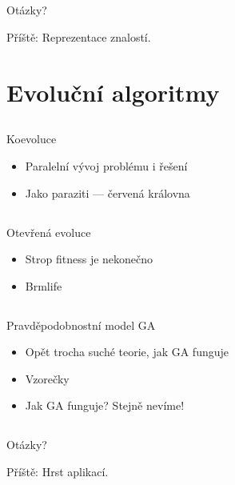 \documentclass{beamer}
\begin{document}
\subsection{}
\begin{frame}{Otázky?}
\begin{center}
Příště: Reprezentace znalostí.
\end{center}
\end{frame}

\section{Evoluční algoritmy}

\subsection{}
\begin{frame}{Koevoluce}
\begin{itemize}
\item Paralelní vývoj problému i řešení
\item Jako paraziti --- červená královna
\end{itemize}
\end{frame}

\subsection{}
\begin{frame}{Otevřená evoluce}
\begin{itemize}
\item Strop fitness je nekonečno
\item Brmlife
\end{itemize}
\end{frame}

\subsection{}
\begin{frame}{Pravděpodobnostní model GA}
\begin{itemize}
\item Opět trocha suché teorie, jak GA funguje
\item Vzorečky
\item Jak GA funguje? Stejně nevíme!
\end{itemize}
\end{frame}

\subsection{}
\begin{frame}{Otázky?}
\begin{center}
Příště: Hrst aplikací.
\end{center}
\end{frame}
\end{document}
